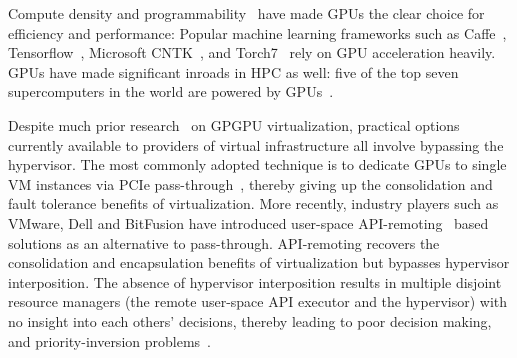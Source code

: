 
Compute density and programmability~\cite{nvidia_cuda, stone2010opencl,
gregory2014c++} have made GPUs the clear choice for efficiency and
performance:
Popular machine learning frameworks such as Caffe~\cite{jia2014caffe},
Tensorflow~\cite{abadi2016tensorflow}, Microsoft CNTK~\cite{yu2014cntk},
and Torch7~\cite{collobert2011torch7} rely on GPU acceleration heavily.
GPUs have made significant inroads in HPC as well: five of the top seven
supercomputers in the world are powered by GPUs~\cite{top500-Nov2018}.

Despite much prior research~\cite{rossbach16vee, kaveri16vee,
cc-numa-gpu-hpca15, abhishek-ispass16} on GPGPU virtualization, practical
options currently available to providers of virtual infrastructure all involve
bypassing the hypervisor. The most commonly adopted technique is to dedicate
GPUs to single VM instances via PCIe pass-through~\cite{AWS-gpu,gVirt},
thereby giving up the consolidation and fault tolerance benefits of
virtualization. More recently, industry players such as VMware, Dell and
BitFusion have introduced user-space API-remoting~\cite{bitfusion-whitepaper,
kim2012snucl, rCUDAnew, vmCUDA,rCUDA} based solutions as an alternative to
pass-through. API-remoting recovers the consolidation and encapsulation
benefits of virtualization but bypasses hypervisor interposition. The absence
of hypervisor interposition results in multiple disjoint resource managers
(the remote user-space API executor and the hypervisor) with no insight into
each others' decisions, thereby leading to poor decision making, and
priority-inversion problems~\cite{rossbach2011ptask}.


